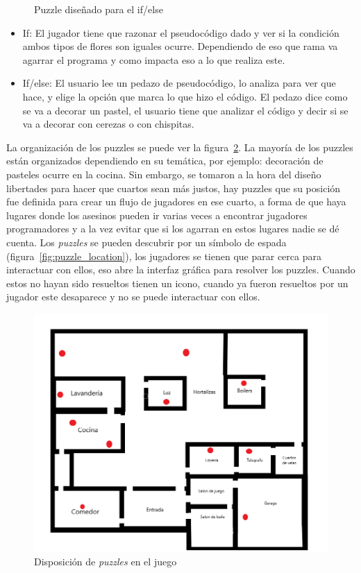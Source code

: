 \begin{itemize}
\begin{figure}[H]
                \caption{Puzzle diseñado para el if/else}
                \label{fig:if_else_puzzle}
            \end{figure}
    \begin{itemize}
        \item If: El jugador tiene que razonar el pseudocódigo dado y ver si la condición ambos tipos de flores son iguales ocurre. Dependiendo de eso que rama va agarrar el programa y como impacta eso a lo que realiza este.
        \item If/else: El usuario lee un pedazo de pseudocódigo, lo analiza para ver que hace, y elige la opción que marca lo que hizo el código. El pedazo dice como se va a decorar un pastel, el usuario tiene que analizar el código y decir si se va a decorar con cerezas o con chispitas.
    \end{itemize}
\end{itemize}

La organización de los puzzles se puede ver la figura~\ref{fig:items_on_map}. La mayoría de los puzzles están organizados dependiendo en su temática, por ejemplo: decoración de pasteles ocurre en la cocina. Sin embargo, se tomaron a la hora del diseño libertades para hacer que cuartos sean más justos, hay puzzles que su posición fue definida para crear un flujo de jugadores en ese cuarto, a forma de que haya lugares donde los asesinos pueden ir varias veces a encontrar jugadores programadores y a la vez evitar que si los agarran en estos lugares nadie se dé cuenta.
Los \textit{puzzles} se pueden descubrir por un símbolo de espada (figura~\ref{fig:puzzle_location}), los jugadores se tienen que parar cerca para interactuar con ellos, eso abre la interfaz gráfica para resolver los puzzles. Cuando estos no hayan sido resueltos tienen un icono, cuando ya fueron resueltos por un jugador este desaparece y no se puede interactuar con ellos.

\begin{figure}[H]
    \centering
    \includegraphics[width=0.5\linewidth]{images/MapaJuegoConItems.png}
    \caption{Disposición de \textit{puzzles} en el juego}
    \label{fig:items_on_map}
\end{figure}

